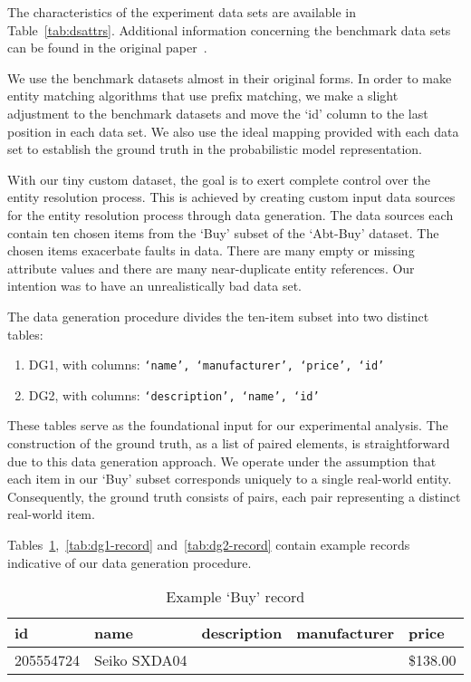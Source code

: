 The characteristics of the experiment data sets are available in
Table~\ref{tab:dsattrs}. Additional information concerning the benchmark
data sets can be found in the original paper~\cite{vldb2010}.

We use the benchmark datasets almost in their original forms.
In order to make entity matching algorithms that use prefix matching, we make a
slight adjustment to the benchmark datasets and move the `id' column to the last
position in each data set.
We also use the ideal mapping provided with each data set to establish the
ground truth in the probabilistic model representation.

With our tiny custom dataset, the goal is to exert complete control over the entity
resolution process.
This is achieved by creating custom input data sources for the entity resolution
process through data generation.
The data sources each contain ten chosen items from the `Buy' subset of the
`Abt-Buy' dataset.
The chosen items exacerbate faults in data.
There are many empty or missing attribute values and there are many
near-duplicate entity references.
Our intention was to have an unrealistically bad data set.

The data generation procedure divides the ten-item subset into two distinct
tables:

\begin{enumerate}[label=\textbullet,leftmargin=1cm]
\item DG1, with columns: \texttt{`name', `manufacturer', `price', `id'}
\item DG2, with columns: \texttt{`description', `name', `id'}
\end{enumerate}

These tables serve as the foundational input for our experimental analysis.
The construction of the ground truth, as a list of paired elements, is
straightforward due to this data generation approach.
We operate under the assumption that each item in our `Buy' subset
corresponds uniquely to a single real-world entity.
Consequently, the ground truth consists of pairs, each pair representing a
distinct real-world item.

Tables~\ref{tab:buy-record},~\ref{tab:dg1-record} and~\ref{tab:dg2-record} contain example
records indicative of our data generation procedure.

\begin{table}[ht]
    \setlength\tabcolsep{5pt}
    \centering
    \begin{tabular}{lllll}
        \toprule
        id&name&description&manufacturer&price\\
        \midrule
        205554724&Seiko SXDA04& & &\$138.00\\
        \bottomrule
    \end{tabular}
    \caption{Example `Buy' record}\label{tab:buy-record}
\end{table}

